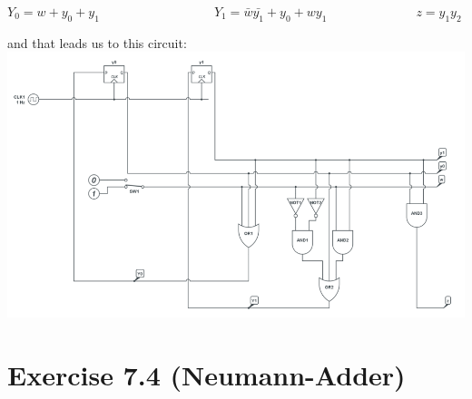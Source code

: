 \documentclass[10pt,a4paper]{scrartcl}
\begin{document}
$Y_0=w+y_0+y_1\qquad\qquad\qquad\qquad\quad Y_1=\bar{w}\bar{y_1} + y_0 + wy_1\qquad\qquad\qquad\quad z=y_1y_2$

and that leads us to this circuit:\\
\includegraphics[width=\textwidth]{images/automat.png} 


\FloatBarrier
\section*{Exercise 7.4 (Neumann-Adder)}
\end{document}
